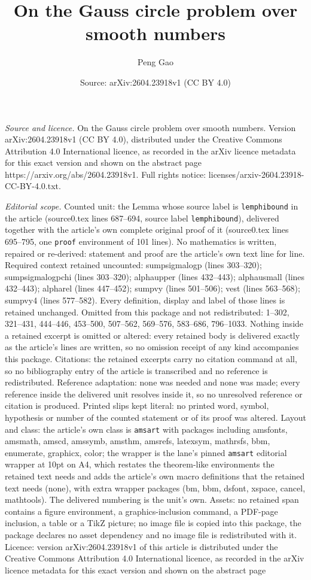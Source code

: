 \documentclass[10pt,a4paper]{amsart}
\title[On the Gauss circle problem over smooth numbers]{On the Gauss circle problem over smooth numbers}
\author{Peng Gao}
\date{Source: arXiv:2604.23918v1 (CC BY 4.0)}
\begin{document}
\maketitle

\noindent\emph{Source and licence.} On the Gauss circle problem over smooth numbers. Version arXiv:2604.23918v1 (CC BY 4.0), distributed under the Creative Commons Attribution 4.0 International licence, as recorded in the arXiv licence metadata for this exact version and shown on the abstract page https://arxiv.org/abs/2604.23918v1. Full rights notice: licenses/arxiv-2604.23918-CC-BY-4.0.txt.\par\smallskip

\noindent\textit{Editorial scope.} Counted unit: the Lemma whose source label is \texttt{lemphibound} in the article (source0.tex lines 687--694, source label \texttt{lemphibound}), delivered together with the article's own complete original proof of it (source0.tex lines 695--795, one \texttt{proof} environment of 101 lines). No mathematics is written, repaired or re-derived: statement and proof are the article's own text line for line. Required context retained uncounted: sumpsigmalogp (lines 303--320); sumpsigmalogpchi (lines 303--320); alphaupper (lines 432--443); alphausmall (lines 432--443); alpharel (lines 447--452); sumpvy (lines 501--506); vest (lines 563--568); sumpvy4 (lines 577--582). Every definition, display and label of those lines is retained unchanged. Omitted from this package and not redistributed: 1--302, 321--431, 444--446, 453--500, 507--562, 569--576, 583--686, 796--1033. Nothing inside a retained excerpt is omitted or altered: every retained body is delivered exactly as the article's lines are written, so no omission receipt of any kind accompanies this package. Citations: the retained excerpts carry no citation command at all, so no bibliography entry of the article is transcribed and no reference is redistributed. Reference adaptation: none was needed and none was made; every reference inside the delivered unit resolves inside it, so no unresolved reference or citation is produced. Printed slips kept literal: no printed word, symbol, hypothesis or number of the counted statement or of its proof was altered. Layout and class: the article's own class is \texttt{amsart} with packages including amsfonts, amsmath, amscd, amssymb, amsthm, amsrefs, latexsym, mathrsfs, bbm, enumerate, graphicx, color; the wrapper is the lane's pinned \texttt{amsart} editorial wrapper at 10pt on A4, which restates the theorem-like environments the retained text needs and adds the article's own macro definitions that the retained text needs (none), with extra wrapper packages (bm, bbm, dsfont, xspace, cancel, mathtools). The delivered numbering is the unit's own. Assets: no retained span contains a figure environment, a graphics-inclusion command, a PDF-page inclusion, a table or a TikZ picture; no image file is copied into this package, the package declares no asset dependency and no image file is redistributed with it. Licence: version arXiv:2604.23918v1 of this article is distributed under the Creative Commons Attribution 4.0 International licence, as recorded in the arXiv licence metadata for this exact version and shown on the abstract page 
\end{document}
